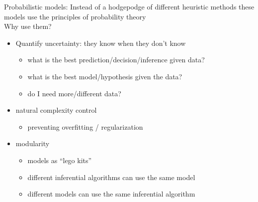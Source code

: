 \documentclass[mathserif]{beamer}
\begin{document}
\begin{frame}
        \small
    \begin{block}{Probabilistic models:}
        \bigskip
        Instead of a hodgepodge of different heuristic methods
        these models use the principles of probability theory \\
        \bigskip
        Why use them?
        \begin{itemize}
            \item Quantify uncertainty: they know when they don't know
                \begin{itemize}
                    \item what is the best prediction/decision/inference given data? 
                    \item what is the best model/hypothesis given the data? 
                    \item do I need more/different data? 
                \end{itemize}
            \item natural complexity control 
                \begin{itemize}
                    \item preventing overfitting / regularization
                \end{itemize}
            \item modularity
                \begin{itemize}
                    \item models as ``lego kits''
                    \item different inferential algorithms can use the same model
                    \item different models can use the same inferential algorithm
                \end{itemize}
        \end{itemize}
    \end{block}
\end{frame}
\end{document}
